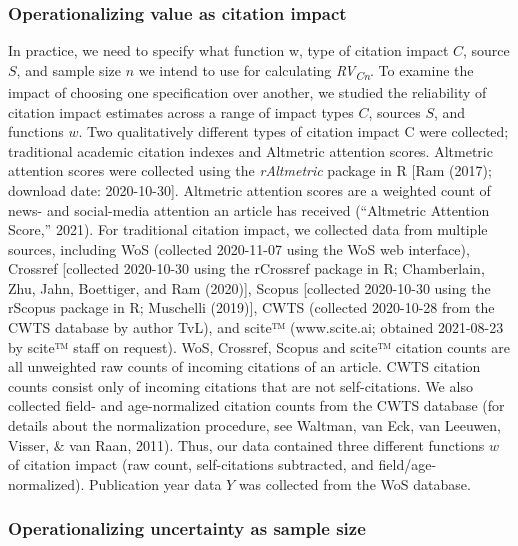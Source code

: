 \documentclass[
  english,
  man,floatsintext]{apa6}
\begin{document}
\hypertarget{operationalizing-value-as-citation-impact}{%
\subsubsection{Operationalizing value as citation impact}\label{operationalizing-value-as-citation-impact}}

In practice, we need to specify what function w, type of citation impact \(C\), source \(S\), and sample size \(n\) we intend to use for calculating \emph{RV\textsubscript{Cn}}. To examine the impact of choosing one specification over another, we studied the reliability of citation impact estimates across a range of impact types \(C\), sources \(S\), and functions \(w\). Two qualitatively different types of citation impact C were collected; traditional academic citation indexes and Altmetric attention scores. Altmetric attention scores were collected using the \emph{rAltmetric} package in R {[}Ram (2017); download date: 2020-10-30{]}. Altmetric attention scores are a weighted count of news- and social-media attention an article has received ({``Altmetric {Attention Score},''} 2021). For traditional citation impact, we collected data from multiple sources, including WoS (collected 2020-11-07 using the WoS web interface), Crossref {[}collected 2020-10-30 using the rCrossref package in R; Chamberlain, Zhu, Jahn, Boettiger, and Ram (2020){]}, Scopus {[}collected 2020-10-30 using the rScopus package in R; Muschelli (2019){]}, CWTS (collected 2020-10-28 from the CWTS database by author TvL), and scite™ (www.scite.ai; obtained 2021-08-23 by scite™ staff on request). WoS, Crossref, Scopus and scite™ citation counts are all unweighted raw counts of incoming citations of an article. CWTS citation counts consist only of incoming citations that are not self-citations. We also collected field- and age-normalized citation counts from the CWTS database (for details about the normalization procedure, see Waltman, van Eck, van Leeuwen, Visser, \& van Raan, 2011). Thus, our data contained three different functions \(w\) of citation impact (raw count, self-citations subtracted, and field/age-normalized). Publication year data \(Y\) was collected from the WoS database.

\hypertarget{operationalizing-uncertainty-as-sample-size}{%
\subsubsection{Operationalizing uncertainty as sample size}\label{operationalizing-uncertainty-as-sample-size}}
\end{document}
